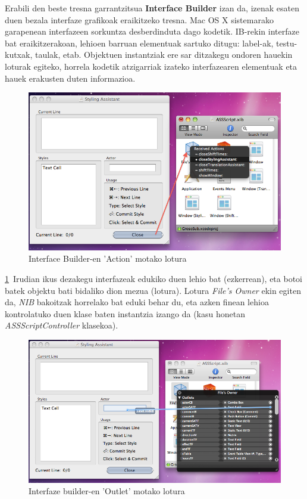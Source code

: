 Erabili den beste tresna garrantzitsua \textbf{Interface Builder} izan da, izenak esaten duen bezala interfaze grafikoak eraikitzeko tresna. Mac OS X sistemarako garapenean interfazeen sorkuntza desberdinduta dago kodetik. IB-rekin interfaze bat eraikitzerakoan, lehioen barruan elementuak sartuko ditugu: label-ak, testu-kutxak, taulak, etab. Objektuen instantziak ere sar ditzakegu ondoren hauekin loturak egiteko, horrela kodetik atzigarriak izateko interfazearen elementuak eta hauek erakusten duten informazioa.
\begin{figure}[htp]
\begin{center}
\includegraphics[scale=0.4]{Pictures/Chapter4/Inplementazioa/iblotura.png}
\caption{Interface Builder-en 'Action' motako lotura}
\label{ib1}
\end{center}
\end{figure}
\ref{ib1}~Irudian ikus dezakegu interfazeak edukiko duen lehio bat (ezkerrean), eta botoi batek objektu bati bidaliko dion mezua (lotura). Lotura \textit{File's Owner} ekin egiten da, \textit{NIB} bakoitzak horrelako bat eduki behar du, eta azken finean lehioa kontrolatuko duen klase baten instantzia izango da (kasu honetan \textit{ASSScriptController} klasekoa).

\begin{figure}[htp]
\begin{center}
\includegraphics[scale=0.4]{Pictures/Chapter4/Inplementazioa/iblotura2.png}
\caption{Interfaze builder-en 'Outlet' motako lotura}
\label{ib2}
\end{center}
\end{figure}

